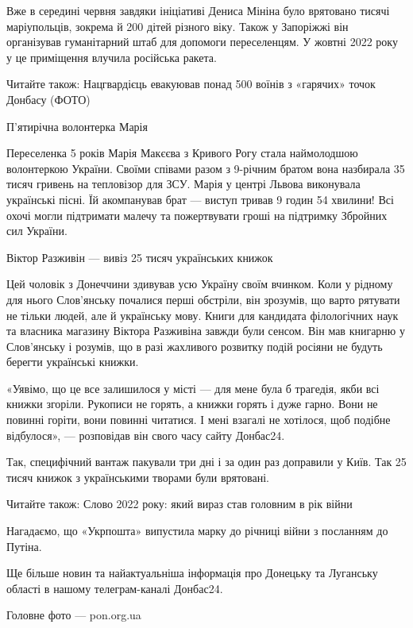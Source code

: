 Вже в середині червня завдяки ініціативі Дениса Мініна було врятовано тисячі
маріупольців, зокрема й 200 дітей різного віку. Також у Запоріжжі він
організував гуманітарний штаб для допомоги переселенцям. У жовтні 2022 року у
це приміщення влучила російська ракета.

Читайте також: Нацгвардієць евакуював понад 500 воїнів з «гарячих» точок
Донбасу (ФОТО)

П'ятирічна волонтерка Марія

Переселенка 5 років Марія Макєєва з Кривого Рогу стала наймолодшою волонтеркою
України. Своїми співами разом з 9-річним братом вона назбирала 35 тисяч гривень
на тепловізор для ЗСУ. Марія у центрі Львова виконувала українські пісні. Їй
акомпанував брат — виступ тривав 9 годин 54 хвилини! Всі охочі могли підтримати
малечу та пожертвувати гроші на підтримку Збройних сил України.

Віктор Разживін — вивіз 25 тисяч українських книжок

Цей чоловік з Донеччини здивував усю Україну своїм вчинком. Коли у рідному для
нього Слов'янську почалися перші обстріли, він зрозумів, що варто рятувати не
тільки людей, але й українську мову. Книги для кандидата філологічних наук та
власника магазину Віктора Разживіна завжди були сенсом. Він мав книгарню у
Слов'янську і розумів, що в разі жахливого розвитку подій росіяни не будуть
берегти українські книжки.

«Уявімо, що це все залишилося у місті — для мене була б трагедія, якби всі
книжки згоріли. Рукописи не горять, а книжки горять і дуже гарно. Вони не
повинні горіти, вони повинні читатися. І мені взагалі не хотілося, щоб подібне
відбулося», — розповідав він свого часу сайту Донбас24.

Так, специфічний вантаж пакували три дні і за один раз доправили у Київ. Так 25
тисяч книжок з українськими творами були врятовані.

Читайте також: Слово 2022 року: який вираз став головним в рік війни

Нагадаємо, що «Укрпошта» випустила марку до річниці війни з посланням до
Путіна.

Ще більше новин та найактуальніша інформація про Донецьку та Луганську області
в нашому телеграм-каналі Донбас24.

Головне фото — pon.org.ua
